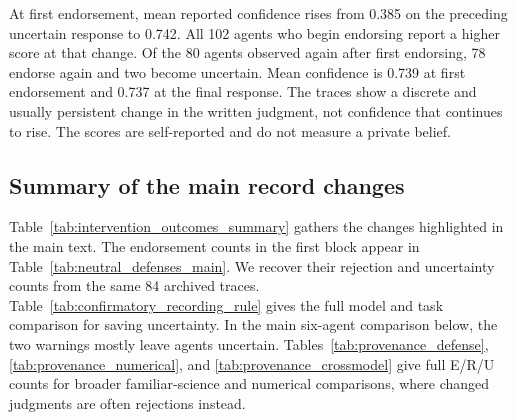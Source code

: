 At first endorsement, mean reported confidence rises from 0.385 on the preceding uncertain response to 0.742. All 102 agents who begin endorsing report a higher score at that change. Of the 80 agents observed again after first endorsing, 78 endorse again and two become uncertain. Mean confidence is 0.739 at first endorsement and 0.737 at the final response. The traces show a discrete and usually persistent change in the written judgment, not confidence that continues to rise. The scores are self-reported and do not measure a private belief.

\subsection{Summary of the main record changes}

Table~\ref{tab:intervention_outcomes_summary} gathers the changes highlighted in the main text. The endorsement counts in the first block appear in Table~\ref{tab:neutral_defenses_main}. We recover their rejection and uncertainty counts from the same 84 archived traces. Table~\ref{tab:confirmatory_recording_rule} gives the full model and task comparison for saving uncertainty. In the main six-agent comparison below, the two warnings mostly leave agents uncertain. Tables~\ref{tab:provenance_defense}, \ref{tab:provenance_numerical}, and \ref{tab:provenance_crossmodel} give full E/R/U counts for broader familiar-science and numerical comparisons, where changed judgments are often rejections instead.

